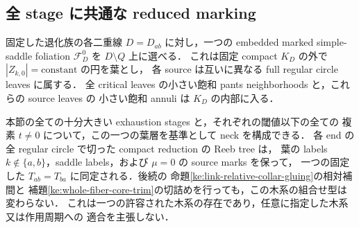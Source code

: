 \subsection{全 stage に共通な reduced marking}

\begin{lemma}
\label{ke:fixed-marked-tree-exhaustion}
固定した退化族の各二重線 $D=D_{ab}$ に対し，一つの embedded marked
simple-saddle foliation $\mathcal F_D^0$ を $D\setminus Q$ 上に選べる．
これは固定 compact $K_D$ の外で $|Z_{k,0}|=\mathrm{constant}$ の円を葉とし，
各 source は互いに異なる full regular circle leaves に属する．
全 critical leaves の小さい飽和 pants neighborhoods と，これらの source leaves の
小さい飽和 annuli は $K_D$ の内部に入る．

本節の全ての十分大きい exhaustion stages と，それぞれの閾値以下の全ての
複素 $t\ne0$ について，この一つの葉層を基準として neck を構成できる．
各 end の全 regular circle で切った compact reduction の Reeb tree は，
葉の labels $k\notin\{a,b\}$，saddle labels，および $\mu=0$ の source marks を保って，
一つの固定した $T_{ab}=T_{ba}$ に同定される．後続の
命題\ref{ke:link-relative-collar-gluing}の相対補間と
補題\ref{ke:whole-fiber-core-trim}の切詰めを行っても，この木系の組合せ型は変わらない．
これは一つの許容された木系の存在であり，任意に指定した木系又は作用周期への
適合を主張しない．
\end{lemma}

